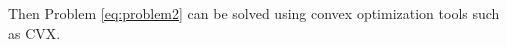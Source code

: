 \documentclass[journal]{IEEEtran}
\begin{document}
 Then Problem \eqref{eq:problem2} can be solved using convex optimization tools such as CVX\cite{cvx}.

%

\end{document}
